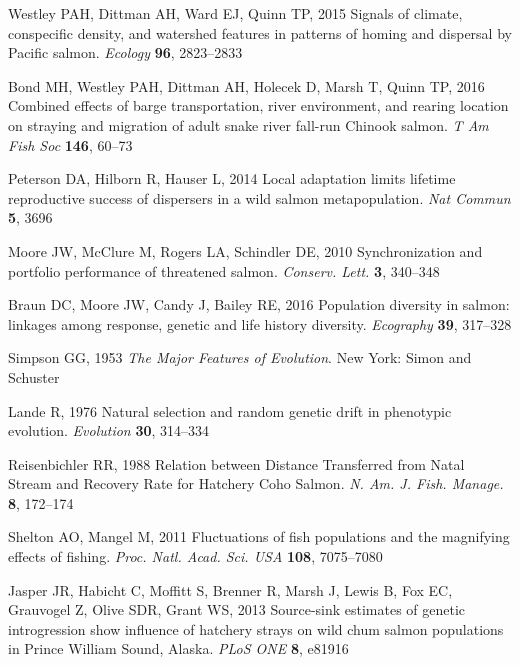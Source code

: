 \documentclass{revtex4}
\begin{document}
\begin{thebibliography}{10}
Westley PAH, Dittman AH, Ward EJ, Quinn TP, 2015 {Signals of climate,
  conspecific density, and watershed features in patterns of homing and
  dispersal by Pacific salmon.}
\newblock \emph{Ecology} \textbf{96}, 2823--2833

Bond MH, Westley PAH, Dittman AH, Holecek D, Marsh T, Quinn TP, 2016 {Combined
  effects of barge transportation, river environment, and rearing location on
  straying and migration of adult snake river fall-run Chinook salmon}.
\newblock \emph{T Am Fish Soc} \textbf{146}, 60--73

Peterson DA, Hilborn R, Hauser L, 2014 {Local adaptation limits lifetime
  reproductive success of dispersers in a wild salmon metapopulation}.
\newblock \emph{Nat Commun} \textbf{5}, 3696

Moore JW, McClure M, Rogers LA, Schindler DE, 2010 {Synchronization and
  portfolio performance of threatened salmon}.
\newblock \emph{Conserv. Lett.} \textbf{3}, 340--348

Braun DC, Moore JW, Candy J, Bailey RE, 2016 {Population diversity in salmon:
  linkages among response, genetic and life history diversity}.
\newblock \emph{Ecography} \textbf{39}, 317--328

Simpson GG, 1953 \emph{{The Major Features of Evolution}}.
\newblock New York: Simon and Schuster

Lande R, 1976 {Natural selection and random genetic drift in phenotypic
  evolution}.
\newblock \emph{Evolution} \textbf{30}, 314--334

Reisenbichler RR, 1988 {Relation between Distance Transferred from Natal Stream
  and Recovery Rate for Hatchery Coho Salmon}.
\newblock \emph{N. Am. J. Fish. Manage.} \textbf{8}, 172--174

Shelton AO, Mangel M, 2011 {Fluctuations of fish populations and the magnifying
  effects of fishing.}
\newblock \emph{Proc. Natl. Acad. Sci. USA} \textbf{108}, 7075--7080

Jasper JR, Habicht C, Moffitt S, Brenner R, Marsh J, Lewis B, Fox EC, Grauvogel
  Z, Olive SDR, Grant WS, 2013 {Source-sink estimates of genetic introgression
  show influence of hatchery strays on wild chum salmon populations in Prince
  William Sound, Alaska}.
\newblock \emph{PLoS ONE} \textbf{8}, e81916


\end{thebibliography}
\end{document}
